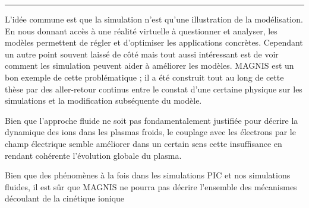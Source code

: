 \begin{center}
\rule{0.6\textwidth}{1pt}
\end{center}

L'idée commune est que la simulation n'est qu'une illustration de la
modélisation. En nous donnant accès à une réalité virtuelle à questionner et
analyser, les modèles permettent de régler et d'optimiser les applications
concrètes. Cependant un autre point souvent laissé de côté mais tout aussi
intéressant est de voir comment les simulation peuvent aider à améliorer les
modèles. MAGNIS est un bon exemple de cette problématique ; il a été construit
tout au long de cette thèse par des aller-retour continus entre le constat d'une
certaine physique sur les simulations et la modification subséquente du modèle.


Bien que
l'approche fluide ne soit pas fondamentalement justifiée pour décrire la
dynamique des ions dans les plasmas froids, le couplage avec les électrons par
le champ électrique semble améliorer dans un certain sens cette insuffisance en
rendant cohérente l'évolution globale du plasma.

Bien que des phénomènes à la fois dans les
simulations PIC et nos simulations fluides, il est sûr que MAGNIS ne
pourra pas décrire l'ensemble des mécanismes découlant de la cinétique ionique

